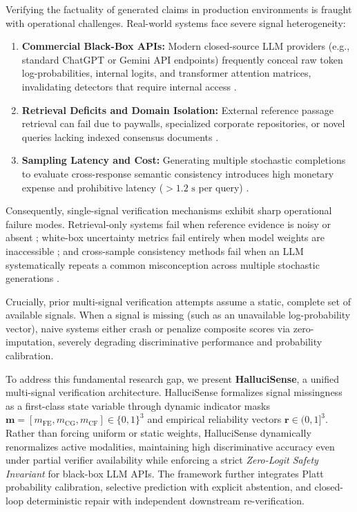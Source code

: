 \documentclass[conference]{IEEEtran}
\begin{document}
Verifying the factuality of generated claims in production environments is fraught with operational challenges. Real-world systems face severe signal heterogeneity:
\begin{enumerate}
    \item \textbf{Commercial Black-Box APIs:} Modern closed-source LLM providers (e.g., standard ChatGPT or Gemini API endpoints) frequently conceal raw token log-probabilities, internal logits, and transformer attention matrices, invalidating detectors that require internal access \cite{manakul2023selfcheckgpt}.
    \item \textbf{Retrieval Deficits and Domain Isolation:} External reference passage retrieval can fail due to paywalls, specialized corporate repositories, or novel queries lacking indexed consensus documents \cite{thorne2018fever, niu2024ragtruth}.
    \item \textbf{Sampling Latency and Cost:} Generating multiple stochastic completions to evaluate cross-response semantic consistency introduces high monetary expense and prohibitive latency ($>1.2\text{ s}$ per query) \cite{kuhn2023semantic}.
\end{enumerate}

Consequently, single-signal verification mechanisms exhibit sharp operational failure modes. Retrieval-only systems fail when reference evidence is noisy or absent \cite{min2023factscore}; white-box uncertainty metrics fail entirely when model weights are inaccessible \cite{chen2024inside, kossen2024semantic}; and cross-sample consistency methods fail when an LLM systematically repeats a common misconception across multiple stochastic generations \cite{manakul2023selfcheckgpt}.

Crucially, prior multi-signal verification attempts assume a static, complete set of available signals. When a signal is missing (such as an unavailable log-probability vector), naive systems either crash or penalize composite scores via zero-imputation, severely degrading discriminative performance and probability calibration.

To address this fundamental research gap, we present \textbf{HalluciSense}, a unified multi-signal verification architecture. HalluciSense formalizes signal missingness as a first-class state variable through dynamic indicator masks $\mathbf{m} = [m_{\text{FE}}, m_{\text{CG}}, m_{\text{CF}}] \in \{0, 1\}^3$ and empirical reliability vectors $\mathbf{r} \in (0, 1]^3$. Rather than forcing uniform or static weights, HalluciSense dynamically renormalizes active modalities, maintaining high discriminative accuracy even under partial verifier availability while enforcing a strict \textit{Zero-Logit Safety Invariant} for black-box LLM APIs. The framework further integrates Platt probability calibration, selective prediction with explicit abstention, and closed-loop deterministic repair with independent downstream re-verification.
\end{document}
